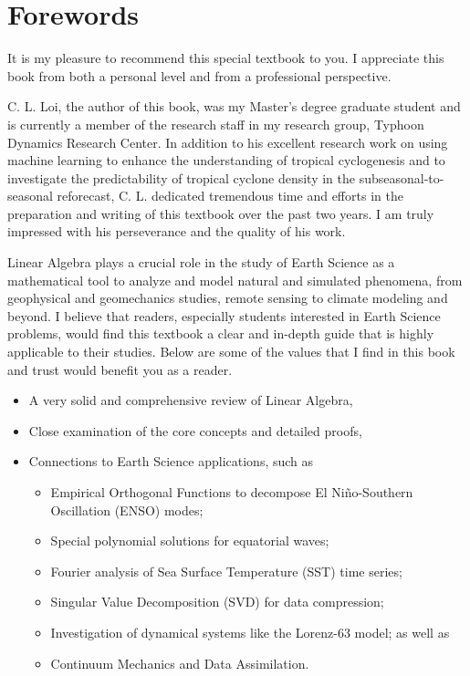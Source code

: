 \chapter*{Forewords}

It is my pleasure to recommend this special textbook to you. I appreciate this book from both a personal level and from a professional perspective.

C. L. Loi, the author of this book, was my Master's degree graduate student and is currently a member of the research staff in my research group, Typhoon Dynamics Research Center. In addition to his excellent research work on using machine learning to enhance the understanding of tropical cyclogenesis and to investigate the predictability of tropical cyclone density in the subseasonal-to-seasonal reforecast, C. L. dedicated tremendous time and efforts in the preparation and writing of this textbook over the past two years. I am truly impressed with his perseverance and the quality of his work.

Linear Algebra plays a crucial role in the study of Earth Science as a mathematical tool to analyze and model natural and simulated phenomena, from geophysical and geomechanics studies, remote sensing to climate modeling and beyond. I believe that readers, especially students interested in Earth Science problems, would find this textbook a clear and in-depth guide that is highly applicable to their studies. Below are some of the values that I find in this book and trust would benefit you as a reader.

\begin{itemize}
    \item A very solid and comprehensive review of Linear Algebra,
    \item Close examination of the core concepts and detailed proofs,
    \item Connections to Earth Science applications, such as 
    \begin{itemize}
        \item Empirical Orthogonal Functions to decompose El Niño-Southern Oscillation (ENSO) modes;
        \item Special polynomial solutions for equatorial waves;
        \item Fourier analysis of Sea Surface Temperature (SST) time series;
        \item Singular Value Decomposition (SVD) for data compression;
        \item Investigation of dynamical systems like the Lorenz-63 model; as well as
        \item Continuum Mechanics and Data Assimilation.
    \end{itemize}
\end{itemize}

